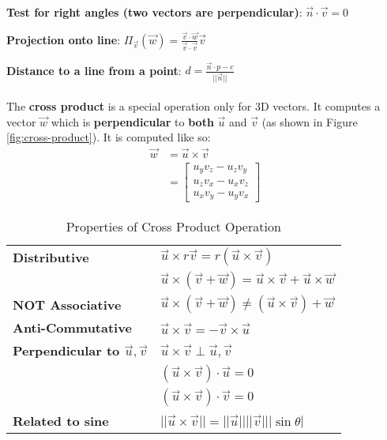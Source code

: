 \documentclass{article}
\begin{document}
\textbf{Test for right angles (two vectors are perpendicular)}: $\vec{n} \cdot \vec{v} = 0$

\textbf{Projection onto line}: $\Pi_{\vec{v}} (\vec{w}) = \frac{\vec{v} \cdot \vec{w}}{\vec{v} \cdot \vec{v}} \vec{v}$

\textbf{Distance to a line from a point}: $d = \frac{\vec{n} \cdot p - c}{||\vec{n}||}$

\paragraph{}

The \textbf{cross product} is a special operation only for 3D vectors. It computes a vector $\vec{w}$ which is \textbf{perpendicular} to \textbf{both} $\vec{u}$ and $\vec{v}$ (as shown in Figure \ref{fig:cross-product}). It is computed like so:
\begin{equation}
\begin{aligned}
	\vec{w} &= \vec{u} \times \vec{v} \\
	&= \left[ \begin{matrix}
		u_y v_z - u_z v_y \\
		u_z v_x - u_x v_z \\
		u_x v_y - u_y v_x
	\end{matrix} \right]
	\label{eq:cross-product}
\end{aligned}
\end{equation}

\begin{table}[H]
	\centering
	\begin{tabular}{ll}
	\textbf{Distributive} & $ \vec{u} \times r \vec{v} = r(\vec{u} \times \vec{v}) $ \\
	& $ \vec{u} \times (\vec{v} + \vec{w}) =  \vec{u} \times \vec{v} + \vec{u} \times \vec{w} $ \\
	\textbf{NOT Associative} & $\vec{u} \times (\vec{v} + \vec{w}) \neq (\vec{u} \times \vec{v}) + \vec{w} $ \\
	\textbf{Anti-Commutative} & $\vec{u} \times \vec{v} = -\vec{v} \times \vec{u}$ \\
	\textbf{Perpendicular to $\vec{u},\vec{v}$} & $ \vec{u} \times \vec{v} \perp \vec{u},\vec{v}$ \\
	& $(\vec{u} \times \vec{v}) \cdot \vec{u} = 0$ \\
	& $(\vec{u} \times \vec{v}) \cdot \vec{v} = 0$ \\
	\textbf{Related to sine} & $ ||\vec{u} \times \vec{v}|| = ||\vec{u}|| ||\vec{v}|| |\sin \theta|$ \\
	\end{tabular}
	\caption{Properties of Cross Product Operation}
	\label{tab:cross-product-properties}
\end{table}
\end{document}
